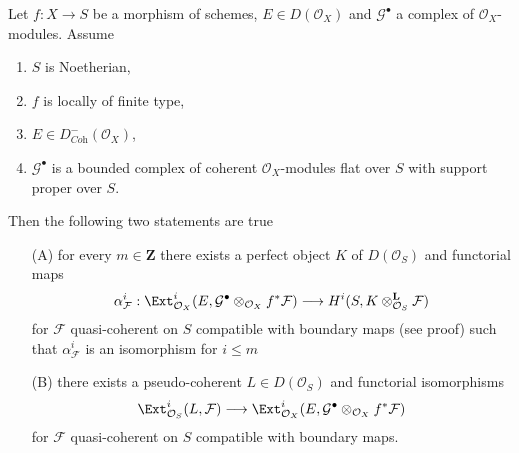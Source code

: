 \begin{lemma}
\label{lemma-compute-ext}
Let $f : X \to S$ be a morphism of schemes, $E \in D(\mathcal{O}_X)$
and $\mathcal{G}^\bullet$ a complex of $\mathcal{O}_X$-modules.
Assume
\begin{enumerate}
\item $S$ is Noetherian,
\item $f$ is locally of finite type,
\item $E \in D^-_{\textit{Coh}}(\mathcal{O}_X)$,
\item $\mathcal{G}^\bullet$ is a bounded complex of
coherent $\mathcal{O}_X$-modules flat over $S$ with support proper over $S$.
\end{enumerate}
Then the following two statements are true
\begin{enumerate}
\item[(A)] for every $m \in \mathbf{Z}$ there exists a perfect object $K$
of $D(\mathcal{O}_S)$ and functorial maps
$$
\alpha^i_\mathcal{F} :
\Ext^i_{\mathcal{O}_X}(E,
\mathcal{G}^\bullet \otimes_{\mathcal{O}_X} f^*\mathcal{F})
\longrightarrow
H^i(S, K \otimes^\mathbf{L}_{\mathcal{O}_S} \mathcal{F})
$$
for $\mathcal{F}$ quasi-coherent on $S$ compatible with boundary maps
(see proof) such that $\alpha^i_\mathcal{F}$ is an isomorphism for $i \leq m$
\item[(B)] there exists a pseudo-coherent $L \in D(\mathcal{O}_S)$
and functorial isomorphisms
$$
\Ext^i_{\mathcal{O}_S}(L, \mathcal{F}) \longrightarrow
\Ext^i_{\mathcal{O}_X}(E,
\mathcal{G}^\bullet \otimes_{\mathcal{O}_X} f^*\mathcal{F})
$$
for $\mathcal{F}$ quasi-coherent on $S$ compatible with boundary maps.
\end{enumerate}
\end{lemma}

